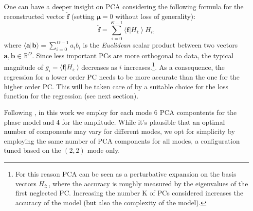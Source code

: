\documentclass[twocolumn,showpacs,preprintnumbers,nofootinbib,prd,
superscriptaddress,10pt]{revtex4-1}
\newcommand{\R}{\mathbb{R}}
\begin{document}
One can have a deeper insight on PCA considering the following formula for the reconstructed vector $\hat{\mathbf{f}}$ (setting $\boldsymbol{\mu}=0$ without loss of generality):
\begin{equation} \label{eq:perturbative_exp}
	\hat{\mathbf{f}} = \sum_{i=0}^{K-1} \langle \mathbf{f} | H_{i:} \rangle \; H_{i:}
\end{equation}
%
where $\langle \mathbf{a} | \mathbf{b} \rangle = \sum_{i=0}^{D-1} a_i b_i$ is the {\it Euclidean} scalar product between two vectors $\mathbf{a}, \mathbf{b} \in \R^D$.
%
Since less important PCs are more orthogonal to data, the typical magnitude of $g_i = \langle \mathbf{f} | H_{i:} \rangle$ decreases as $i$ increases.\footnote{For this reason PCA can be seen as a perturbative expansion on the basis vectors $H_{i:}$, where the accuracy is roughly measured by the eigenvalues of the first neglected PC. Increasing the number K of PCs considered increases the accuracy of the model (but also the complexity of the model).}.
As a consequence, the regression for a lower order PC needs to be more accurate than the one for the higher order PC. This will be taken care of by a suitable choice for the loss function for the regression (see next section).

Following \cite{Schmidt:2020yuu}, in this work we employ for each mode $6$ PCA compontents for the phase model and $4$ for the amplitude.
While it's plausible that an optimal number of components may vary for different modes, we opt for simplicity by employing the same number of PCA components for all modes, a configuration tuned based on the $(2,2)$ mode only.
\end{document}
